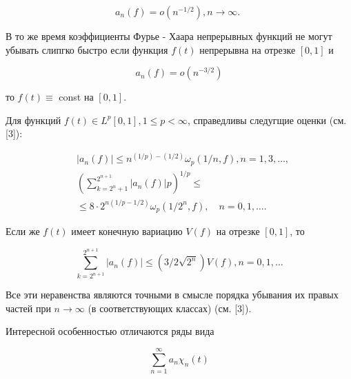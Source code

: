 \documentclass[10pt]{article}
\begin{document}
\[

a_{n}(f)=o\left(n^{-1 / 2}\right), n \longrightarrow \infty \text {. }

\]



В то же время коэффициенты Фурье - Хаара непрерывных функций не могут убывать слипгко быстро если функция $f(t)$ непрерывна на отрезке $[0,1]$ и



\[

a_{n}(f)=o\left(n^{-3 / 2}\right)

\]



то $f(t) \equiv$ const на $[0,1]$.



Для функций $f(t) \in L^{p}[0,1], 1 \leqslant p<\infty$, справедливы следугщие оценки (см. [3]):



\[

\begin{aligned}

&\left|a_{n}(f)\right| \leqslant n^{(1 / p)-(1 / 2)} \omega_{p}(1 / n, f), n=1,3, \ldots, \\

&\left(\sum_{k=2^{n}+1}^{2^{n+1}}\left|a_{n}(f)\right| p\right)^{1 / p} \leqslant \\

& \leqslant 8 \cdot 2^{n(1 / p-1 / 2)} \omega_{p}\left(1 / 2^{n}, f\right), \quad n=0,1, \ldots .

\end{aligned}

\]



Если же $f(t)$ имеет конечную вариацию $V(f)$ на отрезке $[0,1]$, то



\[

\sum_{k=2^{n+1}}^{2^{n+1}}\left|a_{n}(f)\right| \leqslant\left(3 / 2 \sqrt{2^{n}}\right) V(f), n=0,1, \ldots

\]



Все эти неравенства являются точными в смысле порядка убывания их правых частей при $n \rightarrow \infty$ (в соответствующих классах) (см. [3]).



Интересной особенностью отличаются ряды вида



\[

\sum_{n=1}^{\infty} a_{n} \chi_{n}(t)

\]
\end{document}
